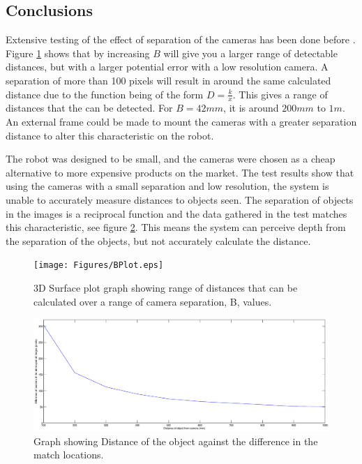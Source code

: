 \subsection{Conclusions}

Extensive testing of the effect of separation of the cameras has been done before \citep{Mrovlje:Distance_Stereoscopic}. Figure \ref{fig:B:Plot} shows that by increasing $B$ will give you a larger range of detectable distances, but with a larger potential error with a low resolution camera. A separation of more than 100 pixels will result in around the same calculated distance due to the function being of the form $D = \frac{k}{x}$. This gives a range of distances that the can be detected. For $B=42mm$, it is around $200mm$ to $1m$. An external frame could be made to mount the cameras with a greater separation distance to alter this characteristic on the robot.

The robot was designed to be small, and the cameras were chosen as a cheap alternative to more expensive products on the market. The test results show that using the cameras with a small separation and low resolution, the system is unable to accurately measure distances to objects seen. The separation of objects in the images is a reciprocal function and the data gathered in the test matches this characteristic, see figure \ref{fig:Distance:DeltaX}. This means the system can perceive depth from the separation of the objects, but not accurately calculate the distance. 

\begin{figure}
\texttt{[image: Figures/BPlot.eps]}
\caption{3D Surface plot graph showing range of distances that can be calculated over a range of camera separation, B, values.}
\label{fig:B:Plot}
\end{figure}
\begin{figure}
\includegraphics[width=\textwidth]{Figures/Distance_DeltaX.eps}
\caption{Graph showing Distance of the object against the difference in the match locations.}
\label{fig:Distance:DeltaX}
\end{figure}

